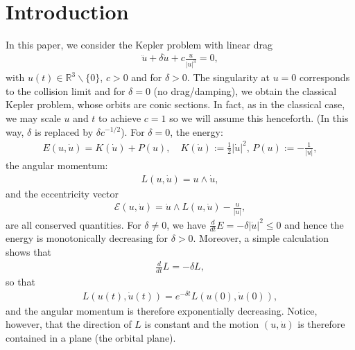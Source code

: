 \documentclass[reqno,12pt]{amsart}
\newcommand{\eqlab}[1]{\label{eq:#1}}
\numberwithin{equation}{section}
\begin{document}
\section{Introduction}
In this paper, we consider the Kepler problem with linear drag \cite{margheri2014a,margheri2017a}
\begin{align}
 \ddot u +\delta \dot u + c \frac{u}{\vert u\vert^3}=0,\eqlab{keplerd}
\end{align}
with $u(t)\in \mathbb R^3\backslash \{0\}$, $c>0$ and for $\delta>0$. %
% 
% 
% 
The singularity at $u=0$ corresponds to the collision limit and for $\delta=0$ (no drag/damping), we obtain the classical Kepler problem, whose orbits are conic sections. In fact, as in the classical case, we may scale $u$ and $t$ to achieve $c=1$ so we will assume this henceforth. (In this way, $\delta$ is replaced by $\delta c^{-1/2}$). 
For $\delta=0$, the energy:
\begin{align*}
 E(u,\dot u) = K(\dot u)+P(u),\quad K(\dot u):=\frac12 \vert \dot u\vert^2,\,P(u):= -\frac{1}{\vert u\vert},%
\end{align*}
the angular momentum:
\begin{align*}
 L(u,\dot u) = u\wedge \dot u,
\end{align*}
and the eccentricity vector
\begin{align*}
 \mathcal E(u,\dot u) = \dot u \wedge L(u,\dot u)-\frac{u}{\vert u\vert},
\end{align*}
are all conserved quantities. %
For $\delta\ne 0$, we have $\frac{d}{dt}E =-\delta \vert \dot u\vert^2\le 0$ and hence the energy is monotonically decreasing for $\delta>0$. %
Moreover, a simple calculation shows that
\begin{align}
 \frac{d}{dt}L = -\delta L,\eqlab{Lt}
\end{align}
so that 
\begin{align}\eqlab{Lsol}L(u(t),\dot u(t))=e^{-\delta t}L(u(0),\dot u(0)),\end{align} and the angular momentum is therefore exponentially decreasing. Notice, however, that the direction of $L$ is constant and the motion $(u,\dot u)$ is therefore contained in a plane (the orbital plane).  %
\end{document}
